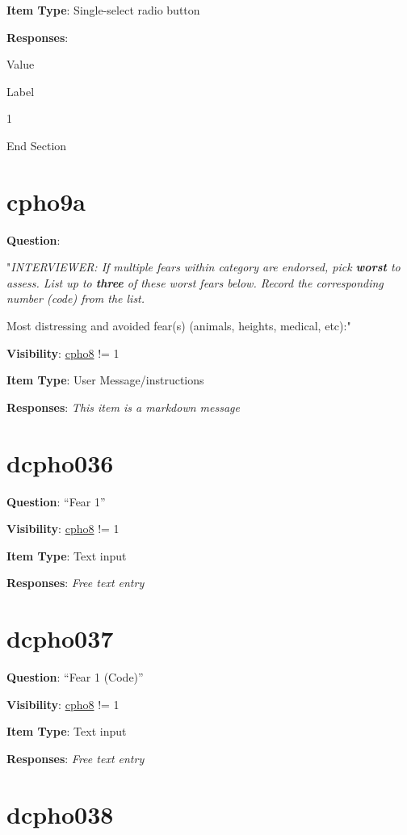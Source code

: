 \documentclass[]{book}
\begin{document}
\textbf{Item Type}: Single-select radio button

\textbf{Responses}:

Value

Label

1

End Section

\hypertarget{cpho9a}{%
\section{cpho9a}\label{cpho9a}}

\textbf{Question}:

"\emph{INTERVIEWER: If multiple fears within category are endorsed, pick \textbf{worst} to assess. List up to \textbf{three} of these worst fears below. Record the corresponding number (code) from the list.}

Most distressing and avoided fear(s) (animals, heights, medical, etc):"

\textbf{Visibility}: \protect\hyperlink{cpho8}{cpho8} != 1

\textbf{Item Type}: User Message/instructions

\textbf{Responses}: \emph{This item is a markdown message}

\hypertarget{dcpho036}{%
\section{dcpho036}\label{dcpho036}}

\textbf{Question}: ``Fear 1''

\textbf{Visibility}: \protect\hyperlink{cpho8}{cpho8} != 1

\textbf{Item Type}: Text input

\textbf{Responses}: \emph{Free text entry}

\hypertarget{dcpho037}{%
\section{dcpho037}\label{dcpho037}}

\textbf{Question}: ``Fear 1 (Code)''

\textbf{Visibility}: \protect\hyperlink{cpho8}{cpho8} != 1

\textbf{Item Type}: Text input

\textbf{Responses}: \emph{Free text entry}

\hypertarget{dcpho038}{%
\section{dcpho038}\label{dcpho038}}
\end{document}
